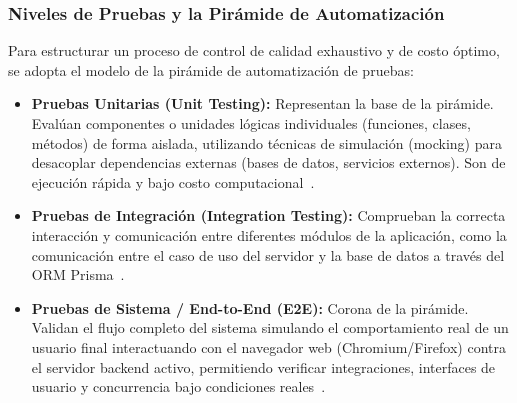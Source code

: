 \documentclass{article}
\begin{document}
\subsubsection*{Niveles de Pruebas y la Pirámide de Automatización}
Para estructurar un proceso de control de calidad exhaustivo y de costo óptimo, se adopta el modelo de la pirámide de automatización de pruebas:
\begin{itemize}
    \item \textbf{Pruebas Unitarias (Unit Testing):} Representan la base de la pirámide. Evalúan componentes o unidades lógicas individuales (funciones, clases, métodos) de forma aislada, utilizando técnicas de simulación (mocking) para desacoplar dependencias externas (bases de datos, servicios externos). Son de ejecución rápida y bajo costo computacional~\cite{jestdocs}.
    \item \textbf{Pruebas de Integración (Integration Testing):} Comprueban la correcta interacción y comunicación entre diferentes módulos de la aplicación, como la comunicación entre el caso de uso del servidor y la base de datos a través del ORM Prisma~\cite{prismadocs}.
    \item \textbf{Pruebas de Sistema / End-to-End (E2E):} Corona de la pirámide. Validan el flujo completo del sistema simulando el comportamiento real de un usuario final interactuando con el navegador web (Chromium/Firefox) contra el servidor backend activo, permitiendo verificar integraciones, interfaces de usuario y concurrencia bajo condiciones reales~\cite{playwrightdocs}.
\end{itemize}
\end{document}
